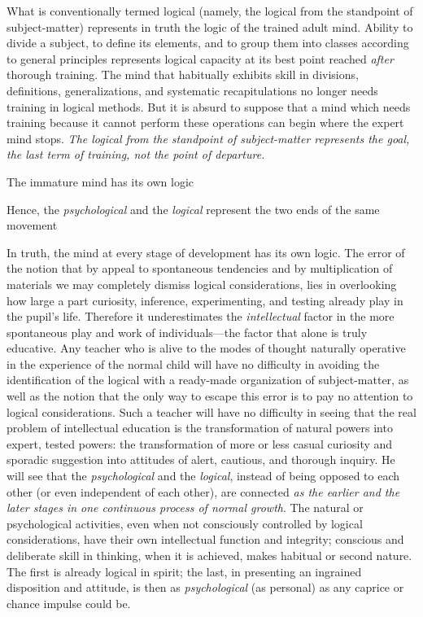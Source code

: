 \documentclass[letterpaper]{book}
\begin{document}
What is conventionally termed logical (namely, the logical from the
standpoint of subject-matter) represents in truth the logic of the
trained adult mind. Ability to divide a subject, to define its elements,
and to group them into classes according to general principles
represents logical capacity at its best point reached \emph{after}
thorough training. The mind that habitually exhibits skill in divisions,
definitions, generalizations, and systematic recapitulations no longer
needs training in logical methods. But it is absurd to suppose that a
mind which needs training because it cannot perform these
operations
can begin where the expert mind stops. \emph{The logical from the
standpoint of subject-matter represents the goal, the last term of
training, not the point of departure.}

The immature mind has its own logic

Hence, the \emph{psychological} and the \emph{logical} represent the two
ends of the same movement

In truth, the mind at every stage of development has its own logic. The
error of the notion that by appeal to spontaneous tendencies and by
multiplication of materials we may completely dismiss logical
considerations, lies in overlooking how large a part curiosity,
inference, experimenting, and testing already play in the pupil's life.
Therefore it underestimates the \emph{intellectual} factor in the more
spontaneous play and work of individuals---the factor that alone is
truly educative. Any teacher who is alive to the modes of thought
naturally operative in the experience of the normal child will have no
difficulty in avoiding the identification of the logical with a
ready-made organization of subject-matter, as well as the notion that
the only way to escape this error is to pay no attention to logical
considerations. Such a teacher will have no difficulty in seeing that
the real problem of intellectual education is the transformation of
natural powers into expert, tested powers: the transformation of more or
less casual curiosity and sporadic suggestion into attitudes of alert,
cautious, and thorough inquiry. He will see that the
\emph{psychological} and the \emph{logical}, instead of being opposed to
each other (or even independent of each other), are connected \emph{as
the earlier and the later stages in one continuous process of normal
growth}. The natural or psychological activities, even when not
consciously controlled by logical considerations, have their own
intellectual function and integrity; conscious and deliberate skill in
thinking, when it is achieved, makes habitual or second nature. The
first is already logical in spirit; the last, in presenting an ingrained
disposition
and attitude, is then as \emph{psychological} (as personal) as any
caprice or chance impulse could be.
\end{document}
